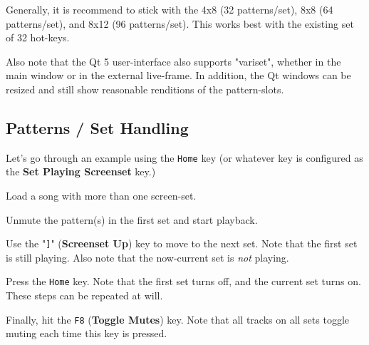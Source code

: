    Generally, it is recommend to stick with the 4x8 (32 patterns/set),
   8x8 (64 patterns/set), and 8x12 (96 patterns/set).  This works best with the
   existing set of 32 hot-keys.

   Also note that the Qt 5 user-interface also supports "variset", whether in
   the main window or in the external live-frame.  In addition, the Qt windows
   can be resized and still show reasonable renditions of the pattern-slots.

\subsection{Patterns / Set Handling}
\label{subsec:patterns_panel_set_handling}

   Let's go through an example using the \texttt{Home} key (or whatever key is
   configured as the \textbf{Set Playing Screenset} key.)

   \begin{enumber}
      \item Load a song with more than one screen-set.
      \item Unmute the pattern(s) in the first set and start playback.
      \item Use the "\texttt{]}" (\textbf{Screenset Up}) key to move to the next
         set.  Note that the first set is still playing.  Also note that the
         now-current set is \textsl{not} playing.
      \item Press the \texttt{Home} key.
         Note that the first set turns off, and the current set turns on.
         These steps can be repeated at will.
      \item Finally, hit the \texttt{F8} (\textbf{Toggle Mutes}) key.
         Note that all tracks on all sets toggle muting each time this key is
         pressed.
   \end{enumber}

